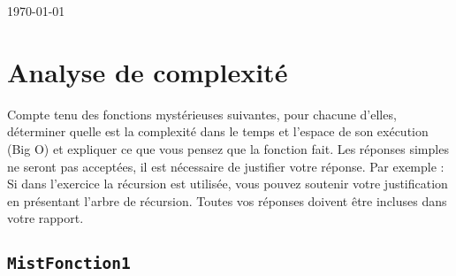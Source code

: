 \documentclass[9pt]{report}
\begin{document}
\begin{titlepage}
	
	
	\vfill\vfill\vfill %
	
	{\large\today} %
	
	
	 
	
	\vfill %
	
\end{titlepage}
\pagebreak
\tableofcontents
\pagebreak


  \vspace{-2em}
  \chapter{Analyse de complexité}

  \vspace{-2em}
  \begin{Exercice}{}{}
    Compte tenu des fonctions mystérieuses suivantes, pour chacune d’elles, 
    déterminer quelle est la complexité dans le temps et l’espace de son exécution 
    (Big O) et expliquer ce que vous pensez que la fonction fait. Les réponses 
    simples ne seront pas acceptées, il est nécessaire de justifier votre réponse.
    Par exemple : Si dans l’exercice la récursion est utilisée, vous pouvez 
    soutenir votre justification en présentant l’arbre de récursion. 
    Toutes vos réponses doivent être incluses dans votre rapport.
  \end{Exercice}
  \section{\texttt{MistFonction1}}
  \vspace{-3em}
  \vspace{-1em}
\end{document}
